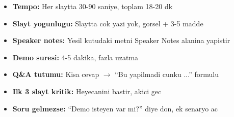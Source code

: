 \documentclass[11pt,a4paper]{article}
\begin{document}
\begin{itemize}
\item \textbf{Tempo:} Her slaytta 30-90 saniye, toplam 18-20 dk
\item \textbf{Slayt yogunlugu:} Slaytta cok yazi yok, gorsel + 3-5 madde
\item \textbf{Speaker notes:} Yesil kutudaki metni Speaker Notes alanina yapistir
\item \textbf{Demo suresi:} 4-5 dakika, fazla uzatma
\item \textbf{Q\&A tutumu:} Kisa cevap $\to$ ``Bu yapilmadi cunku ...'' formulu
\item \textbf{Ilk 3 slayt kritik:} Heyecanini bastir, akici gec
\item \textbf{Soru gelmezse:} ``Demo isteyen var mi?'' diye don, ek senaryo ac
\end{itemize}
\end{document}
